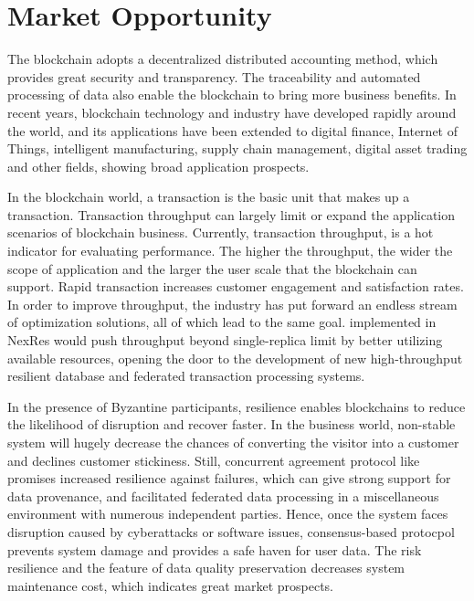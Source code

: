 \section{Market Opportunity}
\par The blockchain adopts a decentralized distributed accounting method, which provides great security 
and transparency. The traceability and automated processing of data also enable the blockchain to 
bring more business benefits. In recent years, blockchain technology and industry have developed 
rapidly around the world\cite{bitcoin, ethereum, hotstuff}, and its applications have been extended 
to digital finance, Internet of Things, intelligent manufacturing, supply chain management, digital 
asset trading and other fields, showing broad application prospects\cite{gupta2021fault}.

\par In the blockchain world, a transaction is the basic unit that makes up a transaction. Transaction 
throughput can largely limit or expand the application scenarios of blockchain business. Currently, 
transaction throughput, is a hot indicator for evaluating performance. The higher the throughput, 
the wider the scope of application and the larger the user scale that the blockchain can support. 
Rapid transaction increases customer engagement and satisfaction rates. In order to improve throughput, 
the industry has put forward an endless stream of optimization solutions, all of which lead to the same 
goal. \RCC{}\cite{rcc} implemented in NexRes would push throughput beyond single-replica limit by better 
utilizing available resources, opening the door to the development of new high-throughput resilient 
database and federated transaction processing systems.

\par In the presence of Byzantine participants\cite{lao2020survey}, resilience enables blockchains to 
reduce the likelihood of disruption and recover faster. In the business 
world, non-stable system will hugely decrease the chances of converting the visitor into a customer 
and declines customer stickiness. Still, concurrent agreement protocol like \RCC{} promises increased 
resilience against failures, which can give strong support for data provenance, and facilitated federated 
data processing in a miscellaneous environment with numerous independent parties. Hence, once the system 
faces disruption caused by cyberattacks or software issues, consensus-based protocpol prevents system damage 
and provides a safe haven for user data. The risk resilience and the feature of data quality preservation 
decreases system maintenance cost, which indicates great market prospects.
